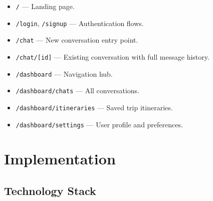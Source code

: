 \documentclass[12pt, a4paper]{article}
\begin{document}
\begin{itemize}[leftmargin=1.5cm, itemsep=0.3em]
  \item \texttt{/} --- Landing page.
  \item \texttt{/login}, \texttt{/signup} --- Authentication flows.
  \item \texttt{/chat} --- New conversation entry point.
  \item \texttt{/chat/[id]} --- Existing conversation with full message history.
  \item \texttt{/dashboard} --- Navigation hub.
  \item \texttt{/dashboard/chats} --- All conversations.
  \item \texttt{/dashboard/itineraries} --- Saved trip itineraries.
  \item \texttt{/dashboard/settings} --- User profile and preferences.
\end{itemize}

\section{Implementation}

\subsection{Technology Stack}
\end{document}
